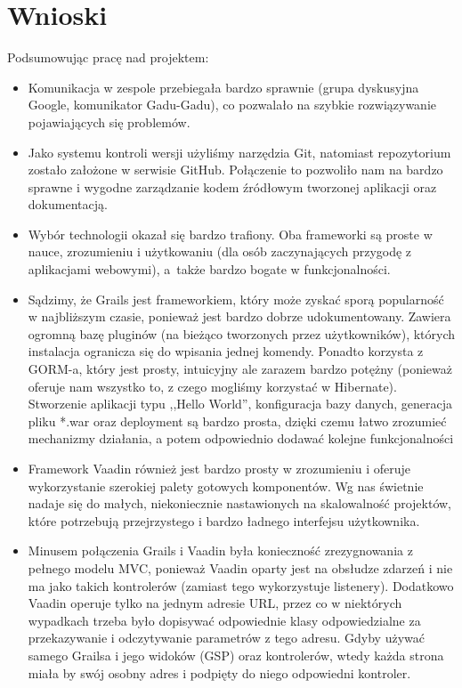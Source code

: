 
\section{Wnioski}
\label{sec:doswiadczenia}

\hspace{15pt}Podsumowując pracę nad projektem: 
\begin{itemize}
\item Komunikacja w zespole przebiegała bardzo sprawnie (grupa dyskusyjna Google, komunikator Gadu-Gadu), co pozwalało na szybkie rozwiązywanie pojawiających się problemów.
\item Jako systemu kontroli wersji użyliśmy narzędzia Git, natomiast repozytorium zostało założone w serwisie GitHub. Połączenie to pozwoliło nam na bardzo sprawne i wygodne zarządzanie kodem źródłowym tworzonej aplikacji oraz dokumentacją.
\item Wybór technologii okazał się bardzo trafiony. Oba frameworki są proste w nauce, zrozumieniu i użytkowaniu (dla osób zaczynających przygodę z aplikacjami webowymi), a~także bardzo bogate w funkcjonalności.
\item Sądzimy, że Grails jest frameworkiem, który może zyskać sporą popularność w najbliższym czasie, ponieważ jest bardzo dobrze udokumentowany. Zawiera ogromną bazę pluginów (na bieżąco tworzonych przez użytkowników), których instalacja ogranicza się do wpisania jednej komendy. Ponadto korzysta z GORM-a, który jest prosty, intuicyjny ale zarazem bardzo potężny (ponieważ oferuje nam wszystko to, z czego mogliśmy korzystać w Hibernate). Stworzenie aplikacji typu ,,Hello World'', konfiguracja bazy danych, generacja pliku *.war oraz deployment są bardzo prosta, dzięki czemu łatwo zrozumieć mechanizmy działania, a potem odpowiednio dodawać kolejne funkcjonalności
\item Framework Vaadin również jest bardzo prosty w zrozumieniu i oferuje wykorzystanie szerokiej palety gotowych komponentów. Wg nas świetnie nadaje się do małych, niekoniecznie nastawionych na skalowalność projektów, które potrzebują przejrzystego i bardzo ładnego interfejsu użytkownika.
\item Minusem połączenia Grails i Vaadin była konieczność zrezygnowania z pełnego modelu MVC, ponieważ Vaadin oparty jest na obsłudze zdarzeń i nie ma jako takich kontrolerów (zamiast tego wykorzystuje listenery). Dodatkowo Vaadin operuje tylko na jednym adresie URL, przez co w niektórych wypadkach trzeba było dopisywać odpowiednie klasy odpowiedzialne za przekazywanie i odczytywanie parametrów z tego adresu. Gdyby używać samego Grailsa i jego widoków (GSP) oraz kontrolerów, wtedy każda strona miała by swój osobny adres i podpięty do niego odpowiedni kontroler. 

\end{itemize}
